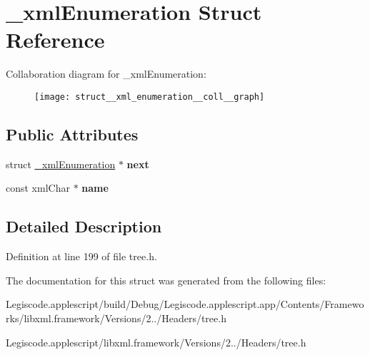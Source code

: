 \hypertarget{struct__xml_enumeration}{\section{\-\_\-xml\-Enumeration Struct Reference}
\label{struct__xml_enumeration}
}


Collaboration diagram for \-\_\-xml\-Enumeration\-:
\nopagebreak
\begin{figure}[H]
\begin{center}
\leavevmode
\texttt{[image: struct\_\_xml\_enumeration\_\_coll\_\_graph]}
\end{center}
\end{figure}
\subsection*{Public Attributes}
\begin{DoxyCompactItemize}
\item 
\hypertarget{struct__xml_enumeration_a80fb1f362d109ee2cf01f4f6adef2b9a}{struct \hyperlink{struct__xml_enumeration}{\-\_\-xml\-Enumeration} $\ast$ {\bfseries next}}\label{struct__xml_enumeration_a80fb1f362d109ee2cf01f4f6adef2b9a}

\item 
\hypertarget{struct__xml_enumeration_a06eb8d6c0faca73ab6d7c9b0ec9a3986}{const xml\-Char $\ast$ {\bfseries name}}\label{struct__xml_enumeration_a06eb8d6c0faca73ab6d7c9b0ec9a3986}

\end{DoxyCompactItemize}


\subsection{Detailed Description}


Definition at line 199 of file tree.\-h.



The documentation for this struct was generated from the following files\-:\begin{DoxyCompactItemize}
\item 
Legiscode.\-applescript/build/\-Debug/\-Legiscode.\-applescript.\-app/\-Contents/\-Frameworks/libxml.\-framework/\-Versions/2../\-Headers/tree.\-h\item 
Legiscode.\-applescript/libxml.\-framework/\-Versions/2../\-Headers/tree.\-h\end{DoxyCompactItemize}
